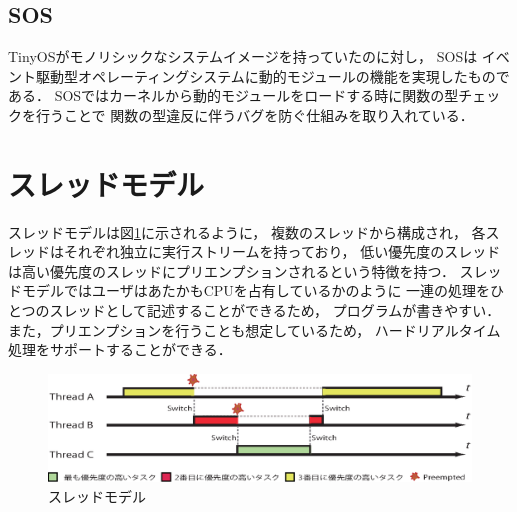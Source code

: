 


\subsection{SOS}
TinyOSがモノリシックなシステムイメージを持っていたのに対し，
SOS\cite{Han:2005:DOS:1067170.1067188}は
イベント駆動型オペレーティングシステムに動的モジュールの機能を実現したものである．
SOSではカーネルから動的モジュールをロードする時に関数の型チェックを行うことで
関数の型違反に伴うバグを防ぐ仕組みを取り入れている．




\section{スレッドモデル}
スレッドモデルは図\ref{fig:threads_model}に示されるように，
複数のスレッドから構成され，
各スレッドはそれぞれ独立に実行ストリームを持っており，
低い優先度のスレッドは高い優先度のスレッドにプリエンプションされるという特徴を持つ．
スレッドモデルではユーザはあたかもCPUを占有しているかのように
一連の処理をひとつのスレッドとして記述することができるため，
プログラムが書きやすい．
また，プリエンプションを行うことも想定しているため，
ハードリアルタイム処理をサポートすることができる．
\begin{figure}[htbp]
 \begin{center}
  \includegraphics[width=140mm]{./images/threads_model.eps}
 \end{center}
 \caption{スレッドモデル}
 \label{fig:threads_model}
\end{figure}


